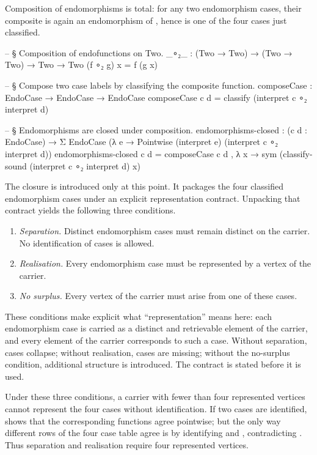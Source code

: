 \documentclass[11pt]{article}
\begin{document}
Composition of endomorphisms is total: for any two endomorphism cases,
their composite is again an endomorphism of , hence
is one of the four cases just classified.

\begin{code}
-- § Composition of endofunctions on Two.
_∘₂_ : (Two → Two) → (Two → Two) → Two → Two
(f ∘₂ g) x = f (g x)

-- § Compose two case labels by classifying the composite function.
composeCase : EndoCase → EndoCase → EndoCase
composeCase c d = classify (interpret c ∘₂ interpret d)

-- § Endomorphisms are closed under composition.
endomorphisms-closed :
  (c d : EndoCase) → Σ EndoCase (λ e → Pointwise (interpret e) (interpret c ∘₂ interpret d))
endomorphisms-closed c d =
  composeCase c d , λ x → sym (classify-sound (interpret c ∘₂ interpret d) x)
\end{code}

The closure is introduced only at this point.  It packages the four
classified endomorphism cases under an explicit representation contract.
Unpacking that contract yields the following three conditions.

\begin{enumerate}
\item \emph{Separation.} Distinct endomorphism cases must remain
  distinct on the carrier.  No identification of cases is allowed.
\item \emph{Realisation.} Every endomorphism case must be represented
  by a vertex of the carrier.
\item \emph{No surplus.} Every vertex of the carrier must arise from
  one of these cases.
\end{enumerate}

These conditions make explicit what ``representation'' means here: each
endomorphism case is carried as a distinct and retrievable element of
the carrier, and every element of the carrier corresponds to such a
case.  Without separation, cases collapse; without realisation, cases
are missing; without the no-surplus condition, additional structure is
introduced.  The contract is stated before it is used.

Under these three conditions, a carrier with fewer than four represented
vertices cannot represent the four cases without identification.  If two
cases are identified,  shows that the
corresponding functions agree pointwise; but the only way different rows
of the four case table agree is by identifying
 and ,
contradicting .  Thus separation and realisation
require four represented vertices.
\end{document}
